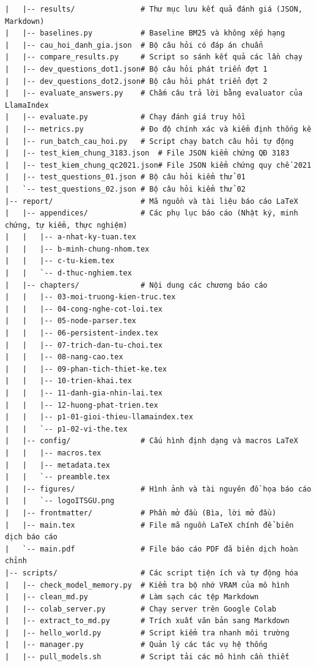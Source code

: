 \begin{lstlisting}[caption={Cấu trúc thư mục dự án.}, label={lst:cau-truc-thu-muc}]
|   |-- results/               # Thư mục lưu kết quả đánh giá (JSON, Markdown)
|   |-- baselines.py           # Baseline BM25 và không xếp hạng
|   |-- cau_hoi_danh_gia.json  # Bộ câu hỏi có đáp án chuẩn
|   |-- compare_results.py     # Script so sánh kết quả các lần chạy
|   |-- dev_questions_dot1.json# Bộ câu hỏi phát triển đợt 1
|   |-- dev_questions_dot2.json# Bộ câu hỏi phát triển đợt 2
|   |-- evaluate_answers.py    # Chấm câu trả lời bằng evaluator của LlamaIndex
|   |-- evaluate.py            # Chạy đánh giá truy hồi
|   |-- metrics.py             # Đo độ chính xác và kiểm định thống kê
|   |-- run_batch_cau_hoi.py   # Script chạy batch câu hỏi tự động
|   |-- test_kiem_chung_3183.json  # File JSON kiểm chứng QĐ 3183
|   |-- test_kiem_chung_qc2021.json# File JSON kiểm chứng quy chế 2021
|   |-- test_questions_01.json # Bộ câu hỏi kiểm thử 01
|   `-- test_questions_02.json # Bộ câu hỏi kiểm thử 02
|-- report/                    # Mã nguồn và tài liệu báo cáo LaTeX
|   |-- appendices/            # Các phụ lục báo cáo (Nhật ký, minh chứng, tự kiểm, thực nghiệm)
|   |   |-- a-nhat-ky-tuan.tex
|   |   |-- b-minh-chung-nhom.tex
|   |   |-- c-tu-kiem.tex
|   |   `-- d-thuc-nghiem.tex
|   |-- chapters/              # Nội dung các chương báo cáo
|   |   |-- 03-moi-truong-kien-truc.tex
|   |   |-- 04-cong-nghe-cot-loi.tex
|   |   |-- 05-node-parser.tex
|   |   |-- 06-persistent-index.tex
|   |   |-- 07-trich-dan-tu-choi.tex
|   |   |-- 08-nang-cao.tex
|   |   |-- 09-phan-tich-thiet-ke.tex
|   |   |-- 10-trien-khai.tex
|   |   |-- 11-danh-gia-nhin-lai.tex
|   |   |-- 12-huong-phat-trien.tex
|   |   |-- p1-01-gioi-thieu-llamaindex.tex
|   |   `-- p1-02-vi-the.tex
|   |-- config/                # Cấu hình định dạng và macros LaTeX
|   |   |-- macros.tex
|   |   |-- metadata.tex
|   |   `-- preamble.tex
|   |-- figures/               # Hình ảnh và tài nguyên đồ họa báo cáo
|   |   `-- logoITSGU.png
|   |-- frontmatter/           # Phần mở đầu (Bìa, lời mở đầu)
|   |-- main.tex               # File mã nguồn LaTeX chính để biên dịch báo cáo
|   `-- main.pdf               # File báo cáo PDF đã biên dịch hoàn chỉnh
|-- scripts/                   # Các script tiện ích và tự động hóa
|   |-- check_model_memory.py  # Kiểm tra bộ nhớ VRAM của mô hình
|   |-- clean_md.py            # Làm sạch các tệp Markdown
|   |-- colab_server.py        # Chạy server trên Google Colab
|   |-- extract_to_md.py       # Trích xuất văn bản sang Markdown
|   |-- hello_world.py         # Script kiểm tra nhanh môi trường
|   |-- manager.py             # Quản lý các tác vụ hệ thống
|   |-- pull_models.sh         # Script tải các mô hình cần thiết

\end{lstlisting}
